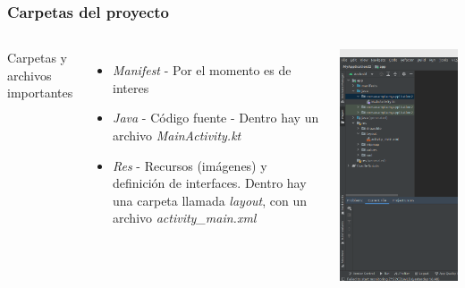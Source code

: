 

\begin{frame}
\frametitle{Carpetas del proyecto}
\begin{columns}
Carpetas y archivos importantes
\begin{itemize}
\item \textit{Manifest} - Por el momento es de interes
\item \textit{Java} - C\'odigo fuente - Dentro hay un archivo \textit{MainActivity.kt}
\item \textit{Res} - Recursos (im\'agenes) y definici\'on de interfaces. Dentro hay una carpeta llamada \textit{layout}, con un archivo \textit{activity\_main.xml}
\end{itemize}
\begin{center}
\includegraphics[width=0.95\linewidth]{01_Modificacion/PanelCarpetas.png}    

\end{center}
\end{columns}
\end{frame}
